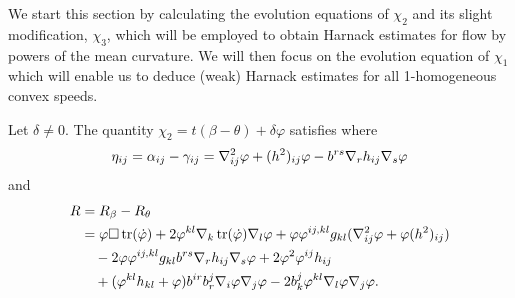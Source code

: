 \documentclass{amsart}
\begin{document}
We start this section by calculating the evolution equations of $\chi_2$ and its slight modification, $\chi_3$, which will be employed to obtain Harnack estimates for flow by powers of the mean curvature. We will then focus on the evolution equation of $\chi_1$ which will enable us to deduce (weak) Harnack estimates for all 1-homogeneous convex speeds.
\begin{proposition}
\label{thm:Evchi}
Let $\delta \neq 0.$ The quantity
$
\chi_2 = t(\beta - \theta) + \delta\varphi
$
satisfies
where
\[
\eta_{ij} = \alpha_{ij} - \gamma_{ij} = \nabla^2_{ij}\varphi + (h^2)_{ij}\varphi - b^{rs}\nabla_r h_{ij}\nabla_s \varphi
\]
and
\[
\begin{split}
R &= R_{\beta} - R_{\theta} \\
&= \varphi \Box \operatorname{tr}(\dot{\varphi}) + 2\varphi^{kl} \nabla_k \operatorname{tr}(\dot{\varphi}) \nabla_l \varphi + \varphi \varphi^{ij,kl}g_{kl} (\nabla^2_{ij} \varphi + \varphi(h^2)_{ij})\\ 
&\quad- 2\varphi \varphi^{ij,kl}g_{kl} b^{rs}\nabla_r h_{ij}\nabla_s \varphi + 2\varphi^{2}\varphi^{ij}h_{ij}\\
&\quad  +(\varphi^{kl}h_{kl} + \varphi)b^{ir}b^{j}_{r}\nabla_i \varphi\nabla_j\varphi - 2 b^{j}_{k}\varphi^{kl}\nabla_l\varphi\nabla_j\varphi.
\end{split}
\]
\end{proposition}
\end{document}
